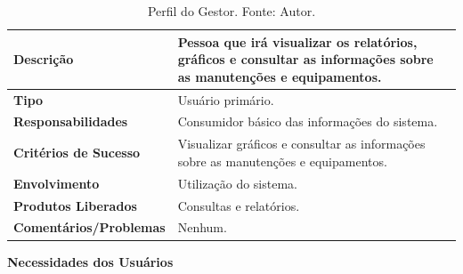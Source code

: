 \begin{table}[H]
\centering
\caption{Perfil do Gestor. Fonte: Autor.}
\label{tab-perfil-gestor}
\begin{tabular}{ | p{5cm} | p{10cm} | }
\hline
	\textbf{Descrição} & Pessoa que irá visualizar os relatórios, gráficos e consultar as informações sobre as manutenções e equipamentos. \\ \hline
	\textbf{Tipo} & Usuário primário. \\ \hline
	\textbf{Responsabilidades} & Consumidor básico das informações do sistema. \\ \hline
	\textbf{Critérios de Sucesso} & Visualizar gráficos e consultar as informações sobre as manutenções e equipamentos. \\ \hline
	\textbf{Envolvimento} & Utilização do sistema. \\ \hline
	\textbf{Produtos Liberados} & Consultas e relatórios. \\ \hline
	\textbf{Comentários/Problemas} & Nenhum. \\ \hline
\end{tabular}
\end{table}

\pagebreak

\textbf{Necessidades dos Usuários}


